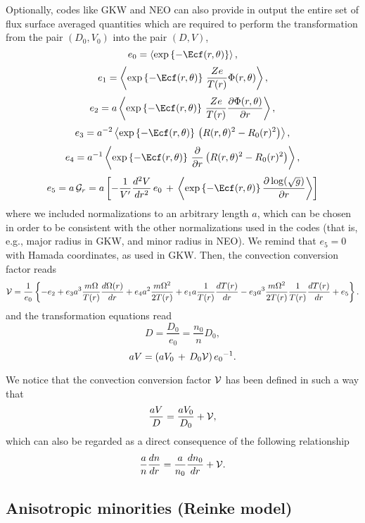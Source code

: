 Optionally, codes like GKW and NEO can also provide in output 
the entire set of flux surface averaged quantities which are required to
perform the transformation from the pair $(D_0, V_0)$ into the pair $(D, V)$,
\[ e_0 = \left \langle \expargs \right \rangle ,\]
\[ e_1 = \left \langle \expargs \, \frac{Ze}{T(r)} \Phi(r,\theta) \right \rangle, \]
\[ e_2 = a \left \langle \expargs \, \frac{Ze}{T(r)} \Pparder \right \rangle, \]
\[ e_3 = a^{-2} \left \langle \expargs \, \Rsqdiff \right \rangle, \]
\[ e_4 = a^{-1} \left \langle \expargs \, \frac{\partial}{\partial r} \Rsqdiff \right \rangle, \]
\[ e_5 = a \, \calGr = a \left [
- \frac{1}{V^\prime} \frac{d^2 V}{d r ^2} \, e_0
\,+\, \left \langle \expargs \frac{\partial \log(\sqrt{g})}{\partial r} \right \rangle
\right] 
\]
where we included normalizations to an arbitrary length $a$, which can be chosen
in order to be consistent with the other normalizations used in the codes
(that is, e.g., major radius in GKW, and minor radius in NEO). We remind
that $e_5 = 0$ with Hamada coordinates, as used in GKW.
Then, the convection conversion factor reads
\[
{\cal V} = \frac{1}{e_0} \left\{ - e_2 
+ e_3 a^3 \frac{m\Omega}{T(r)} \frac{d \Omega(r)}{d r}
+ e_4 a^2 \frac{m\Omega^2}{2T(r)} 
+ e_1 a \frac{1}{T(r)} \frac{d T(r)} {d r} 
- e_3 a^3 \frac{m\Omega^2}{2T(r)} \frac{1}{T(r)} \frac{d T(r)} {d r} + e_5
\right\}.
\]
and the transformation equations read
\[ D =  \frac{D_0}{e_0} = \frac{n_0}{n} D_0,\]
\[ a V =  {\left( a V_0 \,+\,D_0 \cal{V} \right)}\,{e_0}^{-1}.\]

We notice that the convection conversion factor $\cal{V}$ has
been defined in such a way that
\[ \frac{a V}{D} = \frac{a V_0}{D_0}+{\cal V}, \]
which can also be regarded as a direct consequence of the following relationship
\[ \frac{a}{n} \frac{d n}{d r} = \frac{a}{n_0} \frac{d n_0}{d r} + {\cal V}. \]

\subsection{Anisotropic minorities (Reinke model) \label{sec.memo-icrh}}

